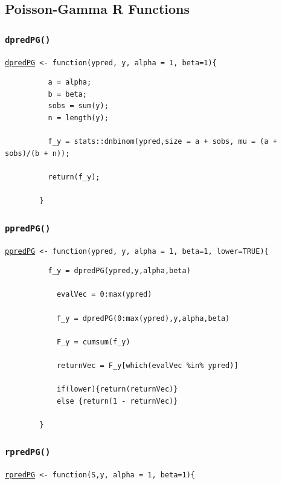 \documentclass[12pt, a4paper]{article}
\begin{document}
  \subsection{Poisson-Gamma R Functions}

    \subsubsection{\texttt{dpredPG()}}\label{sec:dpredPG}

    \texttt{\hyperref[sec:PGimp]{dpredPG} <- function(ypred, y, alpha = 1, beta=1)\{ }

      \begin{verbatim}
          a = alpha;
          b = beta;
          sobs = sum(y);
          n = length(y);

          f_y = stats::dnbinom(ypred,size = a + sobs, mu = (a + sobs)/(b + n));

          return(f_y);

        }
      \end{verbatim}

    \subsubsection{\texttt{ppredPG()}}\label{sec:ppredPG}

    \texttt{\hyperref[sec:PGimp]{ppredPG} <- function(ypred, y, alpha = 1, beta=1, lower=TRUE)\{ }

      \begin{verbatim}
          f_y = dpredPG(ypred,y,alpha,beta)

            evalVec = 0:max(ypred)

            f_y = dpredPG(0:max(ypred),y,alpha,beta)

            F_y = cumsum(f_y)

            returnVec = F_y[which(evalVec %in% ypred)]

            if(lower){return(returnVec)}
            else {return(1 - returnVec)}

        }
      \end{verbatim}

    \subsubsection{\texttt{rpredPG()}}\label{sec:rpredPG}

    \texttt{\hyperref[sec:PGimp]{rpredPG} <- function(S,y, alpha = 1, beta=1)\{ }
\end{document}
